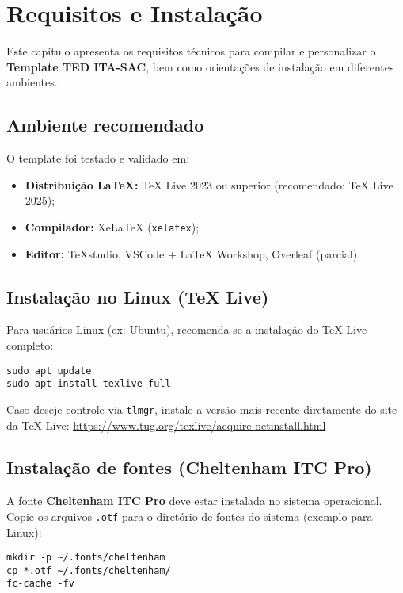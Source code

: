 \chapter{Requisitos e Instalação}

Este capítulo apresenta os requisitos técnicos para compilar e personalizar o \textbf{Template TED ITA-SAC}, bem como orientações de instalação em diferentes ambientes.

\section{Ambiente recomendado}

O template foi testado e validado em:
\begin{itemize}
    \item \textbf{Distribuição \LaTeX:} TeX Live 2023 ou superior (recomendado: TeX Live 2025);
    \item \textbf{Compilador:} XeLaTeX (\texttt{xelatex});
    \item \textbf{Editor:} TeXstudio, VSCode + LaTeX Workshop, Overleaf (parcial).
\end{itemize}

\section{Instalação no Linux (TeX Live)}

Para usuários Linux (ex: Ubuntu), recomenda-se a instalação do TeX Live completo:

\begin{verbatim}
sudo apt update
sudo apt install texlive-full
\end{verbatim}

Caso deseje controle via \texttt{tlmgr}, instale a versão mais recente diretamente do site da TeX Live:
\url{https://www.tug.org/texlive/acquire-netinstall.html}

\section{Instalação de fontes (Cheltenham ITC Pro)}

A fonte \textbf{Cheltenham ITC Pro} deve estar instalada no sistema operacional. Copie os arquivos \texttt{.otf} para o diretório de fontes do sistema (exemplo para Linux):

\begin{verbatim}
mkdir -p ~/.fonts/cheltenham
cp *.otf ~/.fonts/cheltenham/
fc-cache -fv
\end{verbatim}

